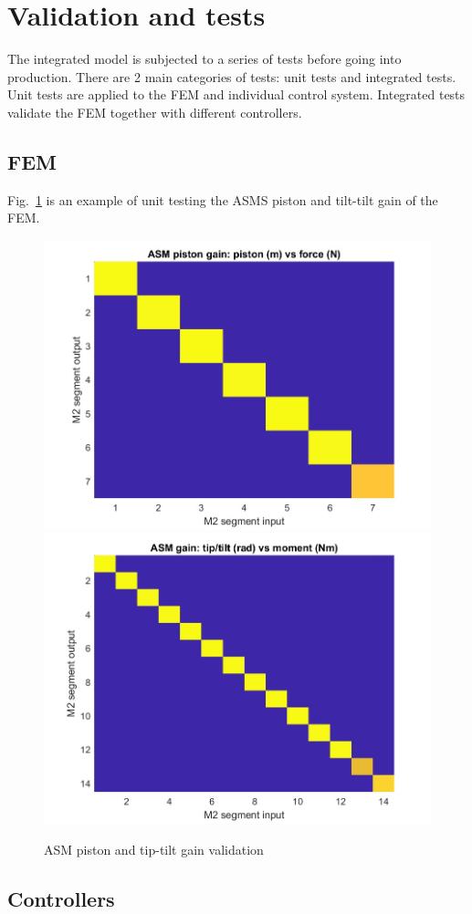 \documentclass{gmto}
\begin{document}
\section{Validation and tests}
\label{sec:tests}

The integrated model is subjected to a series of tests before going into
production.
There are 2 main categories of tests: unit tests and integrated tests.
Unit tests are applied to the FEM and individual control system.
Integrated tests validate the FEM together with different controllers.

\subsection{FEM}
\label{sec:fem-tests}

Fig.~\ref{fig:asm-gains} is an example of unit testing the ASMS piston and
tilt-tilt gain of the FEM. 

\begin{figure}
  \centering
  \includegraphics[width=0.495\linewidth]{FEM/validation/activeOpticsASM/activeOpticsASM_ASM_piston_gains.jpg}
  \includegraphics[width=0.495\linewidth]{FEM/validation/activeOpticsASM/activeOpticsASM ASM tip tilt gains.jpg}
  \caption{ASM piston and tip-tilt gain validation}
  \label{fig:asm-gains}
\end{figure}

\subsection{Controllers}
\label{sec:ctrlr-tests}
\end{document}

